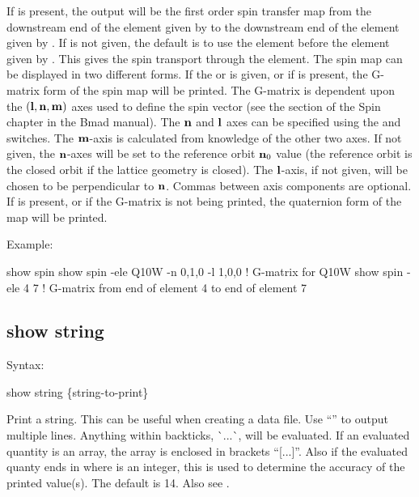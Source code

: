 {{{{{{{{{If  is present, the output will be the first order spin transfer map from the
downstream end of the element given by  to the downstream end of the element
given by .  If  is not given, the default is to use the element
before the element given by . This gives the spin transport through the
 element. The spin map can be displayed in two different forms. If the 
or  is given, or if  is present, the G-matrix form of the spin map will be
printed.  The G-matrix is dependent upon the $({\bf l}, {\bf n}, {\bf m})$ axes used to define the spin
vector (see the  section of the Spin chapter in the Bmad manual). The ${\bf n}$ and
${\bf l}$ axes can be specified using the  and  switches. The ${\bf m}$-axis is
calculated from knowledge of the other two axes. If not given, the ${\bf n}$-axes will be set to the
reference orbit ${\bf n}_0$ value (the reference orbit is the closed orbit if the lattice geometry is
closed).  The ${\bf l}$-axis, if not given, will be chosen to be perpendicular to ${\bf n}$. Commas
between axis components are optional. If  is present, or if the G-matrix is not being
printed, the quaternion form of the map will be printed.


Example:
\begin{example}
  show spin
  show spin -ele Q10W -n 0,1,0 -l 1,0,0  ! G-matrix for Q10W
  show spin -ele 4 7    ! G-matrix from end of element 4 to end of element 7
\end{example}


\subsection{show string}
\label{s:show.string}

Syntax:
\begin{example}
  show string \{string-to-print\}
\end{example}

Print a string. This can be useful when creating a data file. Use ``'' to output multiple
lines. Anything within backticks, \`{}...\`{}, will be evaluated. If an evaluated quantity is an
array, the array is enclosed in brackets ``[...]''. Also if the evaluated quanty ends in
 where  is an integer, this is used to determine the accuracy of the printed
value(s). The default is 14. Also see .

}}}}}}}}}
